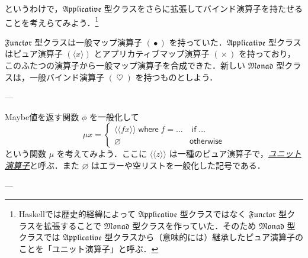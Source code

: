 \documentclass[a4paper]{jsbook}
\newcommand{\programminglanguage}[1]{\textsf{#1}}
\newcommand{\haskell}{\programminglanguage{Haskell}}
\newcommand{\keyword}[1]{{\underline{\emph{#1}}}}
\newcommand{\mSpecialTypeClass}[1]{\mathfrak{#1}} %
\newcommand{\mFunctorTypeClass}{\mSpecialTypeClass{Functor}}
\newcommand{\mApplicativeTypeClass}{\mSpecialTypeClass{Applicative}}
\newcommand{\mMonadTypeClass}{\mSpecialTypeClass{Monad}}\newcommand{\mEmptyList}{{[\,]}}
\newcommand{\mPureNothing}{\varnothing}
\newcommand{\mKeyword}[1]{\mathsf{#1}}
\newcommand{\mIfKeyword}{\mKeyword{if}}
\newcommand{\mOtherwiseKeyword}{\mKeyword{otherwise}}
\newcommand{\mWhereKeyword}{\mKeyword{where}}
\newcommand{\mUnitWith}[1]{\langle\!\langle#1\rangle\!\rangle}
\newcommand{\mPureWith}[1]{\langle#1\rangle}
\newcommand{\mMaybe}[1]{{#1}^\text{?}}
\DeclareMathOperator{\mMap}{\bullet}
\DeclareMathOperator{\mApplicativeMap}{\times}
\DeclareMathOperator{\mBindMaybe}{\spadesuit}%
\DeclareMathOperator{\mBind}{\heartsuit}%
\DeclareMathOperator{\mIf}{\mIfKeyword}
\DeclareMathOperator{\mOtherwise}{\mOtherwiseKeyword}
\DeclareMathOperator{\mWhere}{\mWhereKeyword}
\begin{document}

というわけで，$\mApplicativeTypeClass$ 型クラスをさらに拡張してバインド演算子を持たせることを考えらてみよう．\footnote{\haskell では歴史的経緯によって $\mApplicativeTypeClass$ 型クラスではなく $\mFunctorTypeClass$ 型クラスを拡張することで $\mMonadTypeClass$ 型クラスを作っていた．そのため $\mMonadTypeClass$ 型クラスでは $\mApplicativeTypeClass$ 型クラスから（意味的には）継承したピュア演算子のことを「ユニット演算子」と呼ぶ．}

$\mFunctorTypeClass$ 型クラスは一般マップ演算子 $(\mMap)$ を持っていた．$\mApplicativeTypeClass$ 型クラスはピュア演算子 $(\mPureWith{x})$ とアプリカティブマップ演算子 $(\mApplicativeMap)$ を持っており，このふたつの演算子から一般マップ演算子を合成できた．新しい $\mMonadTypeClass$ 型クラスは，一般バインド演算子 $(\mBind)$ を持つものとしよう．

---

Maybe値を返す関数 $\phi$ を一般化して
\begin{equation}
\mu x=\begin{cases}
\mUnitWith{fx}\mWhere f=\dots&\mIf\dots\\
\mPureNothing&\mOtherwise
\end{cases}
\end{equation}
という関数 $\mu$ を考えてみよう．ここに $\mUnitWith{z}$ は一種のピュア演算子で，\keyword{ユニット演算子}と呼ぶ．また $\mPureNothing$ はエラーや空リストを一般化した記号である．

---
\end{document}
